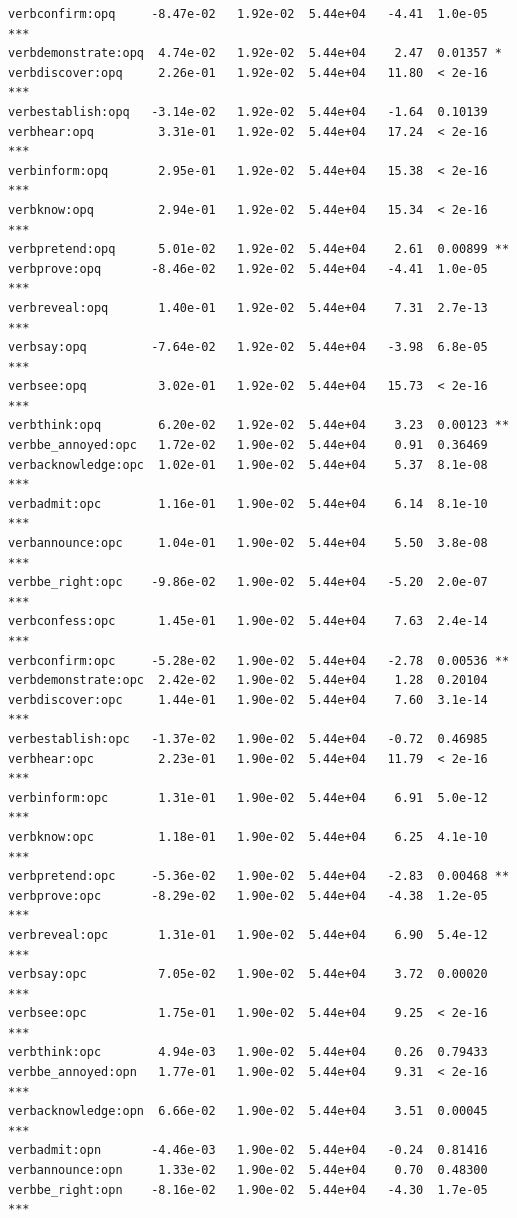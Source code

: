\documentclass[10pt]{article}\usepackage[]{graphicx}\usepackage[]{color}
\makeatletter
\newenvironment{kframe}{%
 \def\at@end@of@kframe{}%
 \ifinner\ifhmode%
  \def\at@end@of@kframe{\end{minipage}}%
  \begin{minipage}{\columnwidth}%
 \fi\fi%
 \def\FrameCommand##1{\hskip\@totalleftmargin \hskip-\fboxsep
 \colorbox{shadecolor}{##1}\hskip-\fboxsep
     \hskip-\linewidth \hskip-\@totalleftmargin \hskip\columnwidth}%
 \MakeFramed {\advance\hsize-\width
   \@totalleftmargin\z@ \linewidth\hsize
   \@setminipage}}%
 {\par\unskip\endMakeFramed%
 \at@end@of@kframe}
\newenvironment{knitrout}{}{} %
\makeatother
\begin{document}
\begin{knitrout}
\begin{kframe}
\begin{verbatim}
verbconfirm:opq     -8.47e-02   1.92e-02  5.44e+04   -4.41  1.0e-05 ***
verbdemonstrate:opq  4.74e-02   1.92e-02  5.44e+04    2.47  0.01357 *  
verbdiscover:opq     2.26e-01   1.92e-02  5.44e+04   11.80  < 2e-16 ***
verbestablish:opq   -3.14e-02   1.92e-02  5.44e+04   -1.64  0.10139    
verbhear:opq         3.31e-01   1.92e-02  5.44e+04   17.24  < 2e-16 ***
verbinform:opq       2.95e-01   1.92e-02  5.44e+04   15.38  < 2e-16 ***
verbknow:opq         2.94e-01   1.92e-02  5.44e+04   15.34  < 2e-16 ***
verbpretend:opq      5.01e-02   1.92e-02  5.44e+04    2.61  0.00899 ** 
verbprove:opq       -8.46e-02   1.92e-02  5.44e+04   -4.41  1.0e-05 ***
verbreveal:opq       1.40e-01   1.92e-02  5.44e+04    7.31  2.7e-13 ***
verbsay:opq         -7.64e-02   1.92e-02  5.44e+04   -3.98  6.8e-05 ***
verbsee:opq          3.02e-01   1.92e-02  5.44e+04   15.73  < 2e-16 ***
verbthink:opq        6.20e-02   1.92e-02  5.44e+04    3.23  0.00123 ** 
verbbe_annoyed:opc   1.72e-02   1.90e-02  5.44e+04    0.91  0.36469    
verbacknowledge:opc  1.02e-01   1.90e-02  5.44e+04    5.37  8.1e-08 ***
verbadmit:opc        1.16e-01   1.90e-02  5.44e+04    6.14  8.1e-10 ***
verbannounce:opc     1.04e-01   1.90e-02  5.44e+04    5.50  3.8e-08 ***
verbbe_right:opc    -9.86e-02   1.90e-02  5.44e+04   -5.20  2.0e-07 ***
verbconfess:opc      1.45e-01   1.90e-02  5.44e+04    7.63  2.4e-14 ***
verbconfirm:opc     -5.28e-02   1.90e-02  5.44e+04   -2.78  0.00536 ** 
verbdemonstrate:opc  2.42e-02   1.90e-02  5.44e+04    1.28  0.20104    
verbdiscover:opc     1.44e-01   1.90e-02  5.44e+04    7.60  3.1e-14 ***
verbestablish:opc   -1.37e-02   1.90e-02  5.44e+04   -0.72  0.46985    
verbhear:opc         2.23e-01   1.90e-02  5.44e+04   11.79  < 2e-16 ***
verbinform:opc       1.31e-01   1.90e-02  5.44e+04    6.91  5.0e-12 ***
verbknow:opc         1.18e-01   1.90e-02  5.44e+04    6.25  4.1e-10 ***
verbpretend:opc     -5.36e-02   1.90e-02  5.44e+04   -2.83  0.00468 ** 
verbprove:opc       -8.29e-02   1.90e-02  5.44e+04   -4.38  1.2e-05 ***
verbreveal:opc       1.31e-01   1.90e-02  5.44e+04    6.90  5.4e-12 ***
verbsay:opc          7.05e-02   1.90e-02  5.44e+04    3.72  0.00020 ***
verbsee:opc          1.75e-01   1.90e-02  5.44e+04    9.25  < 2e-16 ***
verbthink:opc        4.94e-03   1.90e-02  5.44e+04    0.26  0.79433    
verbbe_annoyed:opn   1.77e-01   1.90e-02  5.44e+04    9.31  < 2e-16 ***
verbacknowledge:opn  6.66e-02   1.90e-02  5.44e+04    3.51  0.00045 ***
verbadmit:opn       -4.46e-03   1.90e-02  5.44e+04   -0.24  0.81416    
verbannounce:opn     1.33e-02   1.90e-02  5.44e+04    0.70  0.48300    
verbbe_right:opn    -8.16e-02   1.90e-02  5.44e+04   -4.30  1.7e-05 ***

\end{verbatim}
\end{kframe}
\end{knitrout}
\end{document}
